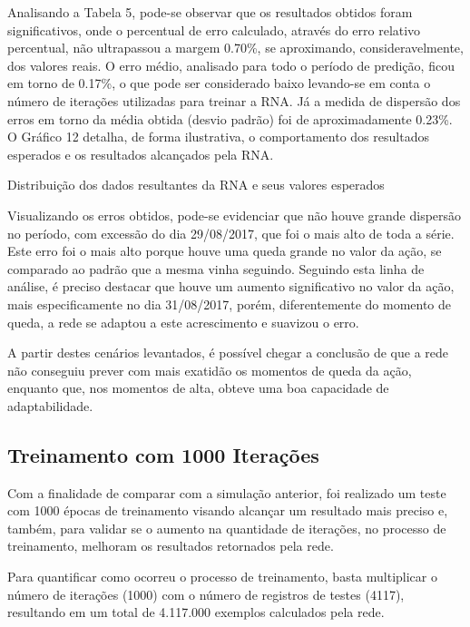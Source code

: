 Analisando a Tabela 5, pode-se observar que os resultados obtidos foram significativos, onde o percentual de erro calculado, através do erro relativo percentual, não ultrapassou a margem 0.70\%, se aproximando, consideravelmente, dos valores reais. O erro médio, analisado para todo o período de predição, ficou em torno de 0.17\%, o que pode ser considerado baixo levando-se em conta o número de iterações utilizadas para treinar a RNA. Já a medida de dispersão dos erros em torno da média obtida (desvio padrão) foi de aproximadamente 0.23\%. O Gráfico 12 detalha, de forma ilustrativa, o comportamento dos resultados esperados e os resultados alcançados pela RNA.
\begin{grafico}[h]
	\centering
	\caption{Distribuição dos dados resultantes da RNA e seus valores esperados}
	\label{lingua}
\end{grafico}

Visualizando os erros obtidos, pode-se evidenciar que não houve grande dispersão no período, com excessão do dia 29/08/2017, que foi o mais alto de toda a série. Este erro foi o mais alto porque houve uma queda grande no valor da ação, se comparado ao padrão que a mesma vinha seguindo. Seguindo esta linha de análise, é preciso destacar que houve um aumento significativo no valor da ação, mais especificamente no dia 31/08/2017, porém, diferentemente do momento de queda, a rede se adaptou a este acrescimento e suavizou o erro. 

A partir destes cenários levantados, é possível chegar a conclusão de que a rede não conseguiu prever com mais exatidão os momentos de queda da ação, enquanto que, nos momentos de alta, obteve uma boa capacidade de adaptabilidade.

\subsection{Treinamento com 1000 Iterações}	
Com a finalidade de comparar com a simulação anterior, foi realizado um teste com 1000 épocas de treinamento visando alcançar um resultado mais preciso e, também, para validar se o aumento na quantidade de iterações, no processo de treinamento, melhoram os resultados retornados pela rede.

Para quantificar como ocorreu o processo de treinamento, basta multiplicar o número de iterações (1000) com o número de registros de testes (4117), resultando em um total de 4.117.000 exemplos calculados pela rede.

